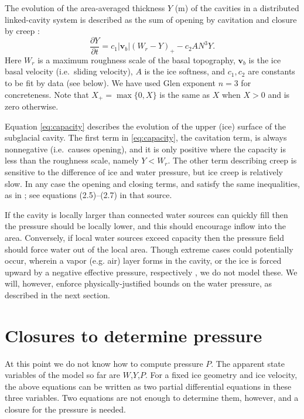 \documentclass[11pt,final]{amsart}%
\newcommand\bv{\mathbf{v}}
\begin{document}
The evolution of the area-averaged thickness $Y$ (m) of the cavities in a distributed linked-cavity system \citep{Schoofetal2012} is described as the sum of opening by cavitation and closure by creep \citep{Hewitt2011}:
\begin{equation}
\frac{\partial Y}{\partial t} = c_1 |\bv_b| (W_r - Y)_+ - c_2 A N^3 Y. \label{eq:capacity}
\end{equation}
Here $W_r$ is a maximum roughness scale of the basal topography, $\bv_b$ is the ice basal velocity (i.e.~sliding velocity), $A$ is the ice softness, and $c_1,c_2$ are constants to be fit by data (see below).  We have used Glen exponent $n=3$ for concreteness.  Note that $X_+= \max\{0,X\}$ is the same as $X$ when $X>0$ and is zero otherwise.

Equation \eqref{eq:capacity} describes the evolution of the upper (ice) surface of the subglacial cavity.  The first term in \eqref{eq:capacity}, the cavitation term, is always nonnegative (i.e.~causes opening), and it is only positive where the capacity is less than the roughness scale, namely $Y<W_r$.  The other term describing creep is sensitive to the difference of ice and water pressure, but ice creep is relatively slow.  In any case the opening and closing terms, and satisfy the same inequalities, as in \cite{Schoofetal2012}; see equations (2.5)--(2.7) in that source.

If the cavity is locally larger than connected water sources can quickly fill then the pressure should be locally lower, and this should encourage inflow into the area.  Conversely, if local water sources exceed capacity then the pressure field should force water out of the local area.  Though extreme cases could potentially occur, wherein a vapor (e.g. air) layer forms in the cavity, or the ice is forced upward by a negative effective pressure, respectively \citep{Schoofetal2012}, we do not model these.  We will, however, enforce physically-justified bounds on the water pressure, as described in the next section.


\section{Closures to determine pressure} \label{sec:closures}

At this point we do not know how to compute pressure $P$.  The apparent state variables of the model so far are $W$,$Y$,$P$.  For a fixed ice geometry and ice velocity, the above equations can be written as two partial differential equations in these three variables.   Two equations are not enough to determine them, however, and a closure for the pressure is needed.
\end{document}
